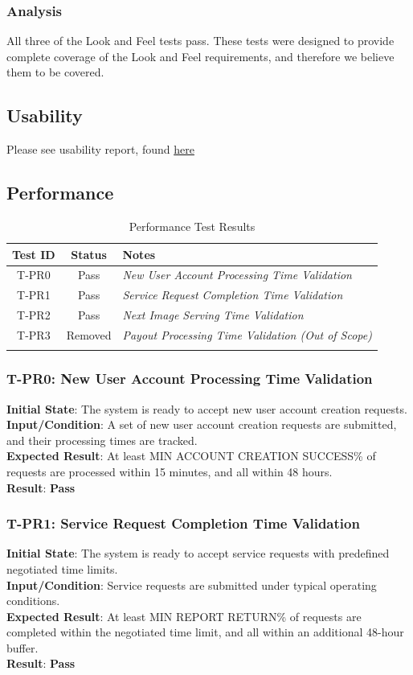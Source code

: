 \documentclass[12pt, titlepage]{article}
\begin{document}
    \subsubsection{Analysis}
    All three of the Look and Feel tests pass. These tests were designed to provide complete coverage of the Look and Feel requirements, and therefore we believe them to be covered.
\subsection{Usability}
	Please see usability report, found \href{https://github.com/OKKM-insights/OKKM.insights/blob/main/docs/Extras/UsabilityReport/UsabilityReport.pdf}{here}

\subsection{Performance}
\begin{longtable}{|c|c|l|}
    \hline
    \textbf{Test ID} & \textbf{Status} & \textbf{Notes} \\
    \hline
    T-PR0 & Pass & \textit{New User Account Processing Time Validation} \\
    T-PR1 & Pass & \textit{Service Request Completion Time Validation} \\
    T-PR2 & Pass & \textit{Next Image Serving Time Validation} \\
    T-PR3 & Removed & \textit{Payout Processing Time Validation (Out of Scope)} \\
    \hline
    \caption{Performance Test Results}
\end{longtable}

\subsubsection{T-PR0: New User Account Processing Time Validation}
\textbf{Initial State}: The system is ready to accept new user account creation requests.\\
\textbf{Input/Condition}: A set of new user account creation requests are submitted, and their processing times are tracked.\\
\textbf{Expected Result}: At least MIN ACCOUNT CREATION SUCCESS\% of requests are processed within 15 minutes, and all within 48 hours.\\
\textbf{Result}: \textbf{Pass}

\subsubsection{T-PR1: Service Request Completion Time Validation}
\textbf{Initial State}: The system is ready to accept service requests with predefined negotiated time limits.\\
\textbf{Input/Condition}: Service requests are submitted under typical operating conditions.\\
\textbf{Expected Result}: At least MIN REPORT RETURN\% of requests are completed within the negotiated time limit, and all within an additional 48-hour buffer.\\
\textbf{Result}: \textbf{Pass}
\end{document}

